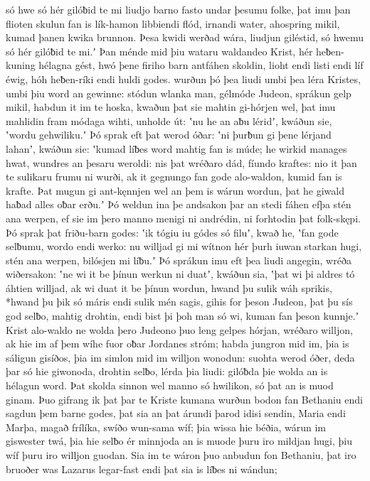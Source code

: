 só hwe só hér gilóƀid te mi liudjo barno
fasto undar þesumu folke, þat imu þan flioten skulun
fan is lík-hamon libbiendi flód,
irnandi water, ahospring mikil,
kumad þanen kwika brunnon. Þesa kwidi werðad wára,
liudjun giléstid, só hwemu só hér gilóƀid te mi.ʼ
Þan ménde mid þiu wataru waldandeo Krist,
hér heƀen-kuning hélagna gést,
hwó þene firiho barn antfáhen skoldin,
lioht endi listi endi líf éwig,
hóh heƀen-ríki endi huldi godes.
wurðun þó þea liudi umbi þea léra Kristes,
umbi þiu word an gewinne: stódun wlanka man,
gélmóde Judeon, sprákun gelp mikil,
habdun it im te hoska, kwaðun þat sie mahtin gi-hórjen wel,
þat imu mahlidin fram módaga wihti,
unholde út: ʽnu he an aƀu léridʼ, kwáðun sie,
ʽwordu gehwiliku.ʼ Þó sprak eft þat werod óðar:
ʽni þurƀun gi þene lérjand lahanʼ, kwáðun sie: ʽkumad líƀes word
mahtig fan is múde; he wirkid manages hwat,
wundres an þesaru weroldi: nis þat wréðaro dád,
fíundo kraftes: nio it þan te sulikaru frumu ni wurði,
ak it gegnungo fan gode alo-waldon,
kumid fan is krafte. Þat mugun gi ant-kęnnjen wel
an þem is wárun wordun, þat he giwald haƀad
alles oƀar erðu.ʼ Þó weldun ina þe andsakon þar
an stedi fáhen efþa stén ana werpen,
ef sie im þero manno menigi ni andrédin,
ni forhtodin þat folk-skępi. Þó sprak þat friðu-barn godes:
ʽik tógiu iu gódes só filuʼ, kwað he, ʽfan gode selƀumu,
wordo endi werko: nu willjad gi mi wítnon hér
þurh iuwan starkan hugi, stén ana werpen,
bilósjen mi líƀu.ʼ Þó sprákun imu eft þea liudi angegin,
wréða wiðersakon: ʽne wi it be þínun werkun ni duatʼ, kwáðun sia,
ʽþat wi þi aldres tó áhtien willjad,
ak wi duat it be þínun wordun, hwand þu sulik wáh sprikis,
*hwand þu þik só máris endi sulik mén sagis,
gihis for þeson Judeon, þat þu sís god selƀo,
mahtig drohtin, endi bist þi þoh man só wi,
kuman fan þeson kunnje.ʼ Krist alo-waldo
ne wolda þero Judeono þuo leng gelpes hórjan,
wréðaro willjon, ak hie im af þem wíhe fuor
oƀar Jordanes stróm; habda jungron mid im,
þia is sáligun gisíðos, þia im simlon mid im
willjon wonodun: suohta werod óðer,
deda þar só hie giwonoda, drohtin selƀo,
lérda þia liudi: gilóƀda þie wolda
an is hélagun word. Þat skolda sinnon wel
manno só hwilikon, só þat an is muod ginam.
Þuo gifrang ik þat þar te Kriste kumana wurðun
bodon fan Bethaniu endi sagdun þem barne godes,
þat sia an þat árundi þarod idisi sendin,
Maria endi Marþa, magað frílíka,
swíðo wun-sama wíf; þia wissa hie béðia,
wárun im giswester twá, þia hie selƀo ér
minnjoda an is muode þuru iro mildjan hugi,
þiu wíf þuru iro willjon guodan. Sia im te wáron þuo
anbudun fon Bethaniu, þat iro bruoðer was
Lazarus legar-fast endi þat sia is líƀes ni wándun;
